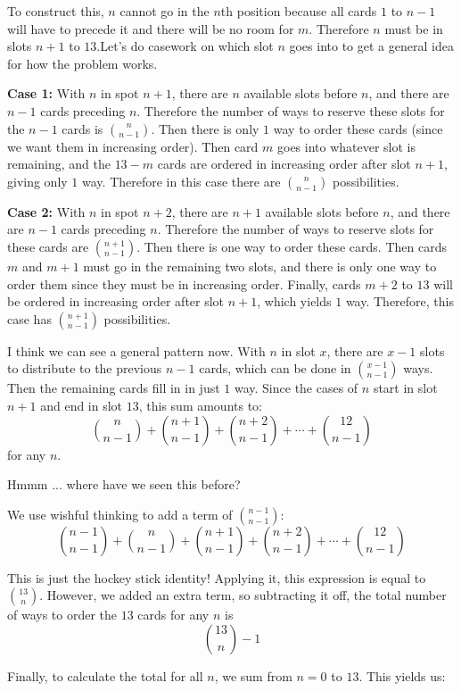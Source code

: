 \begin{enumerate}
 To construct this, $n$ cannot go in the $n$th position because all cards $1$ to $n-1$ will have to precede it and there will be no room for $m$. Therefore $n$ must be in slots $n+1$ to $13$.Let's do casework on which slot $n$ goes into to get a general idea for how the problem works.

 \textbf{Case 1:} With $n$ in spot $n+1$, there are $n$ available slots before $n$, and there are $n-1$ cards preceding $n$. Therefore the number of ways to reserve these slots for the $n-1$ cards is $\binom{n}{n-1}$. Then there is only $1$ way to order these cards (since we want them in increasing order). Then card $m$ goes into whatever slot is remaining, and the $13-m$ cards are ordered in increasing order after slot $n+1$, giving only $1$ way. Therefore in this case there are $\binom{n}{n-1}$ possibilities.

 \textbf{Case 2:} With $n$ in spot $n+2$, there are $n+1$ available slots before $n$, and there are $n-1$ cards preceding $n$. Therefore the number of ways to reserve slots for these cards are $\binom{n+1}{n-1}$. Then there is one way to order these cards. Then cards $m$ and $m+1$ must go in the remaining two slots, and there is only one way to order them since they must be in increasing order. Finally, cards $m+2$ to $13$ will be ordered in increasing order after slot $n+1$, which yields $1$ way. Therefore, this case has $\binom{n+1}{n-1}$ possibilities.

 I think we can see a general pattern now. With $n$ in slot $x$, there are $x-1$ slots to distribute to the previous $n-1$ cards, which can be done in $\binom{x-1}{n-1}$ ways. Then the remaining cards fill in in just $1$ way. Since the cases of $n$ start in slot $n+1$ and end in slot $13$, this sum amounts to:
 \[\binom{n}{n-1}+\binom{n+1}{n-1}+\binom{n+2}{n-1} + \cdots + \binom{12}{n-1}\] for any $n$.

 Hmmm ... where have we seen this before?

 We use wishful thinking to add a term of $\binom{n-1}{n-1}$:
 \[\binom{n-1}{n-1}+\binom{n}{n-1}+\binom{n+1}{n-1}+\binom{n+2}{n-1} + \cdots + \binom{12}{n-1}\]

 This is just the hockey stick identity! Applying it, this expression is equal to $\binom{13}{n}$. However, we added an extra term, so subtracting it off, the total number of ways to order the $13$ cards for any $n$ is 
 \[\binom{13}{n}-1\]

 Finally, to calculate the total for all $n$, we sum from $n=0$ to $13$. This yields us:


\end{enumerate}
